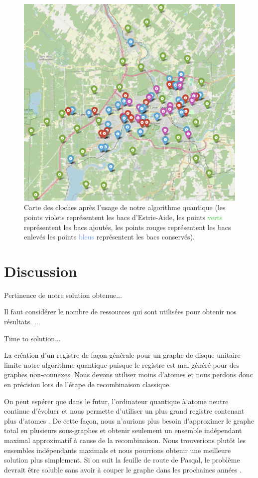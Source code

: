 \documentclass[11pt]{article}
\begin{document}
\begin{figure}[H]
    \centering
    \includegraphics[width=0.49\linewidth]{images/Total.png}
    \caption{Carte des cloches après l'usage de notre algorithme quantique (les points \textcolor{Mulberry}{violets} représentent les bacs d'Estrie-Aide, les points \textcolor{LimeGreen}{verts} représentent les bacs ajoutés, les points \textcolor{BrickRed}{rouges} représentent les bacs enlevés les points \textcolor{CornflowerBlue}{bleus} représentent les bacs conservés).
}
    \label{total}
\end{figure}


\section{Discussion}
Pertinence de notre solution obtenue...


Il faut considérer le nombre de ressources qui sont utilisées pour obtenir nos résultats. ...

Time to solution...\cite{zielewski_method_2022}

La création d'un registre de façon générale pour un graphe de disque unitaire limite notre algorithme quantique puisque le registre est mal généré pour des graphes non-connexes. Nous devons utiliser moins d'atomes et nous perdons donc en précision lors de l'étape de recombinaison classique. 

On peut espérer que dans le futur, l'ordinateur quantique à atome neutre continue d'évoluer et nous permette d'utiliser un plus grand registre contenant plus d'atomes \cite{noauthor_pasqal_nodate}. De cette façon, nous n'aurions plus besoin d'approximer le graphe total en plusieurs sous-graphes et obtenir seulement un ensemble indépendant maximal approximatif à cause de la recombinaison. Nous trouverions plutôt les ensembles indépendants maximals et nous pourrions obtenir une meilleure solution plus simplement. Si on suit la feuille de route de Pasqal, le problème devrait être soluble sans avoir à couper le graphe dans les prochaines années \cite{noauthor_our_nodate}.
\end{document}
